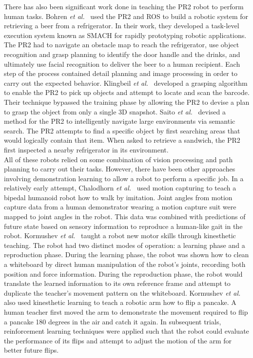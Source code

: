 \documentclass{sig-alternate}
\begin{document}
There has also been significant work done in teaching the PR2 robot to perform human tasks. Bohren \textit{et al.}~\cite{beer} used the PR2 and ROS to build a robotic system for retrieving a beer from a refrigerator. In their work, they developed a task-level execution system known as SMACH for rapidly prototyping robotic applications. The PR2 had to navigate an obstacle map to reach the refrigerator, use object recognition and grasp planning to identify the door handle and the drinks, and ultimately use facial recognition to deliver the beer to a human recipient. Each step of the process contained detail planning and image processing in order to carry out the expected behavior. Klingbeil \textit{et al.}~\cite{groceries} developed a grasping algorithm to enable the PR2 to pick up objects and attempt to locate and scan the barcode. Their technique bypassed the training phase by allowing the PR2 to devise a plan to grasp the object from only a single 3D snapshot. Saito \textit{et al.}~\cite{subway} devised a method for the PR2 to intelligently navigate large environments via semantic search. The PR2 attempts to find a specific object by first searching areas that would logically contain that item. When asked to retrieve a sandwich, the PR2 first inspected a nearby refrigerator in its environment.\\ 

All of these robots relied on some combination of vision processing and path planning to carry out their tasks. However, there have been other approaches involving demonstration learning to allow a robot to perform a specific job. In a relatively early attempt, Chalodhorn \textit{et al.}~\cite{walk_imitation} used motion capturing to teach a bipedal humanoid robot how to walk by imitation. Joint angles from motion capture data from a human demonstrator wearing a motion capture suit were mapped to joint angles in the robot. This data was combined with predictions of future state based on sensory information to reproduce a human-like gait in the robot. Kormushev \textit{et al.}~\cite{whiteboard} taught a robot new motor skills through kinesthetic teaching. The robot had two distinct modes of operation: a learning phase and a reproduction phase. During the learning phase, the robot was shown how to clean a whiteboard by direct human manipulation of the robot's joints, recording both position and force information. During the reproduction phase, the robot would translate the learned information to its own reference frame and attempt to duplicate the teacher's movement pattern on the whiteboard.  Kormushev \textit{et al.}~\cite{pancakes} also used kinesthetic learning to teach a robotic arm how to flip a pancake. A human teacher first moved the arm to demonstrate the movement required to flip a pancake 180 degrees in the air and catch it again. In subsequent trials, reinforcement learning techniques were applied such that the robot could evaluate the performance of its flips and attempt to adjust the motion of the arm for better future flips.
\end{document}
